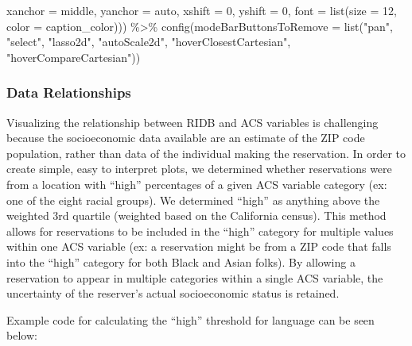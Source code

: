 \documentclass[
  11 pt,
  openany]{book}
\newenvironment{Shaded}{\begin{snugshade}}{\end{snugshade}}
\newcommand{\AttributeTok}[1]{\textcolor[rgb]{0.77,0.63,0.00}{#1}}
\newcommand{\DecValTok}[1]{\textcolor[rgb]{0.00,0.00,0.81}{#1}}
\newcommand{\FunctionTok}[1]{\textcolor[rgb]{0.00,0.00,0.00}{#1}}
\newcommand{\NormalTok}[1]{#1}
\newcommand{\SpecialCharTok}[1]{\textcolor[rgb]{0.00,0.00,0.00}{#1}}
\newcommand{\StringTok}[1]{\textcolor[rgb]{0.31,0.60,0.02}{#1}}
\begin{document}
\begin{Shaded}
\begin{Highlighting}[]
                             \AttributeTok{xanchor =} \StringTok{\textquotesingle{}middle\textquotesingle{}}\NormalTok{, }\AttributeTok{yanchor =} \StringTok{\textquotesingle{}auto\textquotesingle{}}\NormalTok{, }
                             \AttributeTok{xshift =} \DecValTok{0}\NormalTok{, }\AttributeTok{yshift =} \DecValTok{0}\NormalTok{,}
                             \AttributeTok{font =} \FunctionTok{list}\NormalTok{(}\AttributeTok{size =} \DecValTok{12}\NormalTok{, }\AttributeTok{color =}\NormalTok{ caption\_color))) }\SpecialCharTok{\%\textgreater{}\%}
  \FunctionTok{config}\NormalTok{(}\AttributeTok{modeBarButtonsToRemove =} \FunctionTok{list}\NormalTok{(}\StringTok{"pan"}\NormalTok{, }\StringTok{"select"}\NormalTok{, }\StringTok{"lasso2d"}\NormalTok{, }\StringTok{"autoScale2d"}\NormalTok{, }
                                       \StringTok{"hoverClosestCartesian"}\NormalTok{, }\StringTok{"hoverCompareCartesian"}\NormalTok{))}
\end{Highlighting}
\end{Shaded}

\hypertarget{data-relationships}{%
\subsubsection{Data Relationships}\label{data-relationships}}

Visualizing the relationship between RIDB and ACS variables is challenging because the socioeconomic data available are an estimate of the ZIP code population, rather than data of the individual making the reservation. In order to create simple, easy to interpret plots, we determined whether reservations were from a location with ``high'' percentages of a given ACS variable category (ex: one of the eight racial groups). We determined ``high'' as anything above the weighted 3rd quartile (weighted based on the California census). This method allows for reservations to be included in the ``high'' category for multiple values within one ACS variable (ex: a reservation might be from a ZIP code that falls into the ``high'' category for both Black and Asian folks). By allowing a reservation to appear in multiple categories within a single ACS variable, the uncertainty of the reserver's actual socioeconomic status is retained.

Example code for calculating the ``high'' threshold for language can be seen below:
\end{document}
